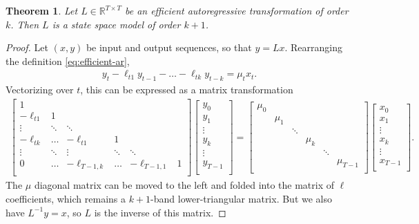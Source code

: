 \documentclass{article}
\newtheorem{theorem}{Theorem}[section]
\newcommand{\R}{\mathbb{R}}
\begin{document}
\begin{theorem}
  \label{thm:ss-sma-formal}
  Let $L \in \R^{T \times T}$ be an efficient autoregressive transformation of order $k$.
  Then $L$ is a state space model of order $k+1$.
\end{theorem}
\begin{proof}
  Let $(x, y)$ be input and output sequences, so that $y = Lx$.
  Rearranging the definition \eqref{eq:efficient-ar},
  \begin{align*}
    y_t - \ell_{t1} y_{t-1} - \dots - \ell_{tk} y_{t-k} = \mu_t x_t
    .
  \end{align*}
  Vectorizing over $t$, this can be expressed as a matrix transformation
  \begin{align*}
    \begin{bmatrix}
      1 & \\
      -\ell_{t1} & 1 \\
      \vdots & \ddots & \ddots \\
      -\ell_{tk} & \dots & -\ell_{t1} & 1 \\
      \vdots & \ddots & \vdots & \ddots & \ddots \\
      0 & \dots & -\ell_{T-1,k} & \dots & -\ell_{T-1,1} & 1 \\
    \end{bmatrix}
    \begin{bmatrix}
      y_0 \\
      y_1 \\
      \vdots \\
      y_k \\
      \vdots \\
      y_{T-1} \\
    \end{bmatrix}
    =
    \begin{bmatrix}
      \mu_0 \\
      & \mu_1 \\
      & & \ddots \\
      & & & \mu_k \\
      & & & & \ddots \\
      & & & & & \mu_{T-1} \\
    \end{bmatrix}
    \begin{bmatrix}
      x_0 \\
      x_1 \\
      \vdots \\
      x_k \\
      \vdots \\
      x_{T-1} \\
    \end{bmatrix}
    .
  \end{align*}
  The $\mu$ diagonal matrix can be moved to the left and folded into the matrix of $\ell$ coefficients,
  which remains a $k+1$-band lower-triangular matrix.
  But we also have $L^{-1} y = x$, so $L$ is the inverse of this matrix.


\end{proof}
\end{document}
